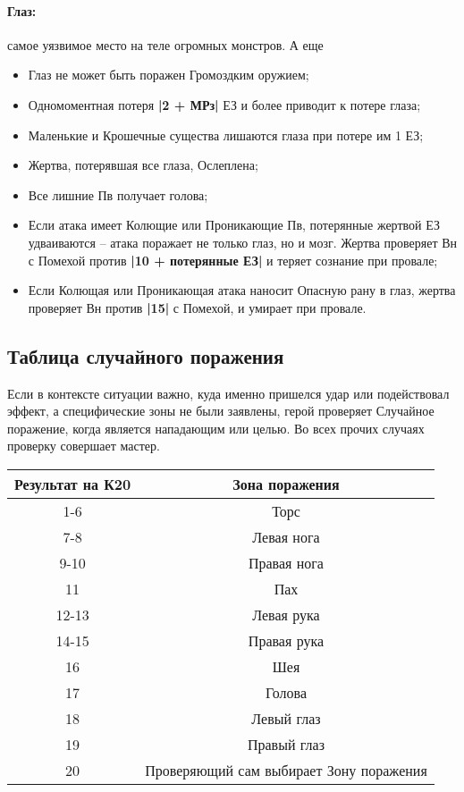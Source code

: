 \paragraph{Глаз:} самое уязвимое место на теле огромных монстров. А еще
\begin{itemize}
  \item Глаз не может быть поражен Громоздким оружием;
  \item Одномоментная потеря \textbf{|2 + МРз|} ЕЗ и более приводит к потере глаза;
  \item Маленькие и Крошечные существа лишаются глаза при потере им 1 ЕЗ;
  \item Жертва, потерявшая все глаза, Ослеплена;
  \item Все лишние Пв получает голова;
  \item Если атака имеет Колющие или Проникающие Пв, потерянные жертвой ЕЗ удваиваются – атака поражает не только глаз, но и мозг. Жертва проверяет Вн с Помехой против \textbf{|10 + потерянные ЕЗ|} и теряет сознание при провале;
  \item Если Колющая или Проникающая атака наносит Опасную рану в глаз, жертва проверяет Вн против \textbf{|15|} с Помехой, и умирает при провале.
\end{itemize}
\subsection{Таблица случайного поражения}
Если в контексте ситуации важно, куда именно пришелся удар или подействовал эффект, а специфические зоны не были заявлены, герой проверяет Случайное поражение, когда является нападающим или целью. Во всех прочих случаях проверку совершает мастер.
\begin{center} \begin{tabular}{|c|c|} \hline
  \textbf{Результат на К20} & \textbf{Зона поражения} \\ \hline
  1-6 & Торс \\ \hline
  7-8 & Левая нога \\ \hline
  9-10 & Правая нога \\ \hline
  11 & Пах \\ \hline
  12-13 & Левая рука \\ \hline
  14-15 & Правая рука \\ \hline
  16 & Шея \\ \hline
  17 & Голова \\ \hline
  18 & Левый глаз \\ \hline
  19 & Правый глаз \\ \hline
  20 & Проверяющий сам выбирает Зону поражения \\ \hline
\end{tabular} \end{center}
